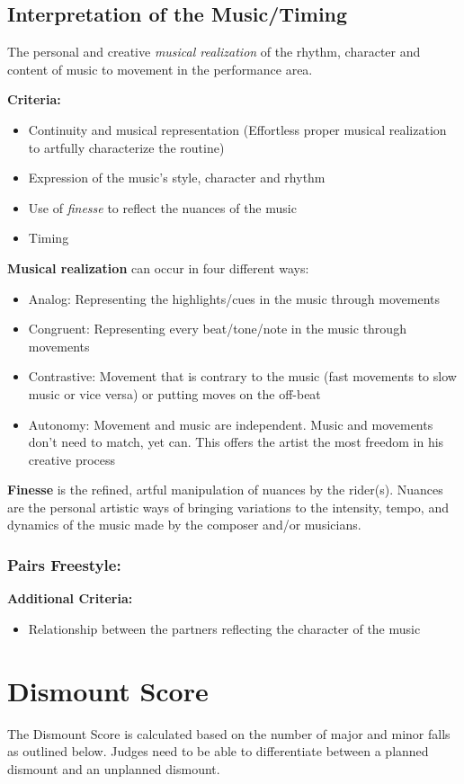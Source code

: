 \subsection{Interpretation of the Music/Timing}
The personal and creative \emph{musical realization} of the rhythm, character and content of music to movement in the performance area.

\textbf{Criteria:}
\begin{itemize}
\item Continuity and musical representation (Effortless proper musical realization to artfully characterize the routine)
\item Expression of the music's style, character and rhythm
\item Use of \emph{finesse} to reflect the nuances of the music
\item Timing
\end{itemize}

\textbf{Musical realization} can occur in four different ways:
\begin{itemize}
\item Analog: Representing the highlights/cues in the music through movements
\item Congruent: Representing every beat/tone/note in the music through movements
\item Contrastive: Movement that is contrary to the music (fast movements to slow music or vice versa) or putting moves on the off-beat
\item Autonomy: Movement and music are independent.
Music and movements don't need to match, yet can.
This offers the artist the most freedom in his creative process
\end{itemize}

\textbf{Finesse} is the refined, artful manipulation of nuances by the rider(s).
Nuances are the personal artistic ways of bringing variations to the intensity, tempo, and dynamics of the music made by the composer and/or musicians.

\subsubsection{Pairs Freestyle:}
\textbf{Additional Criteria:}
\begin{itemize}
\item Relationship between the partners reflecting the character of the music
\end{itemize}

\section{Dismount Score \label{sec:freestyle_dismount-score}}
The Dismount Score is calculated based on the number of major and minor falls as outlined below.
Judges need to be able to differentiate between a planned dismount and an unplanned dismount.

